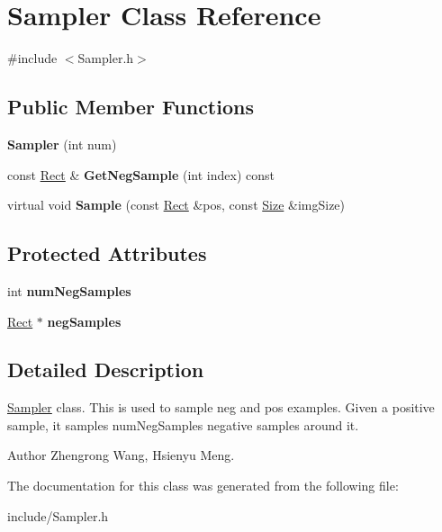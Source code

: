 \hypertarget{classSampler}{}\section{Sampler Class Reference}
\label{classSampler}


{\ttfamily \#include $<$Sampler.\+h$>$}

\subsection*{Public Member Functions}
\begin{DoxyCompactItemize}
\item 
\hypertarget{classSampler_a0727b36ff20644682b62f045b19c01f1}{}{\bfseries Sampler} (int num)\label{classSampler_a0727b36ff20644682b62f045b19c01f1}

\item 
\hypertarget{classSampler_a2852a91585490fa3d2898d6e7009e220}{}const \hyperlink{classRect}{Rect} \& {\bfseries Get\+Neg\+Sample} (int index) const \label{classSampler_a2852a91585490fa3d2898d6e7009e220}

\item 
\hypertarget{classSampler_ad7ce26173f71f996dc5049ce29d459b5}{}virtual void {\bfseries Sample} (const \hyperlink{classRect}{Rect} \&pos, const \hyperlink{classSize}{Size} \&img\+Size)\label{classSampler_ad7ce26173f71f996dc5049ce29d459b5}

\end{DoxyCompactItemize}
\subsection*{Protected Attributes}
\begin{DoxyCompactItemize}
\item 
\hypertarget{classSampler_ab8d285d18bbc01dac8b645552d8b7a8b}{}int {\bfseries num\+Neg\+Samples}\label{classSampler_ab8d285d18bbc01dac8b645552d8b7a8b}

\item 
\hypertarget{classSampler_ac86c718e801891189286793cd8a6757f}{}\hyperlink{classRect}{Rect} $\ast$ {\bfseries neg\+Samples}\label{classSampler_ac86c718e801891189286793cd8a6757f}

\end{DoxyCompactItemize}


\subsection{Detailed Description}
\hyperlink{classSampler}{Sampler} class. This is used to sample neg and pos examples. Given a positive sample, it samples num\+Neg\+Samples negative samples around it. \begin{DoxyAuthor}{Author}
Zhengrong Wang, Hsienyu Meng. 
\end{DoxyAuthor}


The documentation for this class was generated from the following file\+:\begin{DoxyCompactItemize}
\item 
include/Sampler.\+h\end{DoxyCompactItemize}
